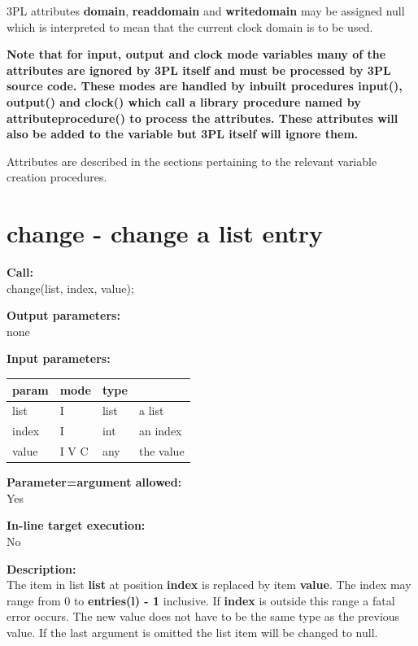         3PL attributes {\bf domain}, {\bf readdomain} and {\bf writedomain} may be
        assigned null which is interpreted to mean that the current clock domain is
        to be used.
        
        {\bf Note that for input, output and clock mode variables many of the
        attributes are ignored by 3PL itself and must be processed by 3PL source
        code. These modes are handled by inbuilt procedures input(), output() and
        clock() which call a library procedure named by
        attributeprocedure() to process the
        attributes. These attributes will also be added to the variable but 3PL
        itself will ignore them.}
        
        Attributes are described in the sections pertaining to the relevant
        variable creation procedures.



    \section{change - change a list entry}\label{sec:ipchange}
        
        {\bf Call:} \\
        change(list, index, value);
        
        {\bf Output parameters:} \\
        none
        
        {\bf Input parameters:} \\
        \begin{tabular}{| l | l | l | l |}
        \hline
        param  & mode & type & \\
        \hline \hline
        list   & I     & list & a list   \\ \hline
        index  & I     & int  & an index   \\ \hline
        value  & I V C & any  & the value   \\ \hline
        \end{tabular}
        
        {\bf Parameter=argument allowed:} \\
        Yes
        
        {\bf In-line target execution:} \\
        No
        
        {\bf Description:} \\
        The item in list {\bf list} at position {\bf index} is replaced by item
        {\bf value}. The index may range from 0 to {\bf entries(l) - 1}
        inclusive. If {\bf index} is outside this range a fatal error
        occurs. The new value does not have to be the same type as the
        previous value. If the last argument is omitted the list item will
        be changed to null.
        
